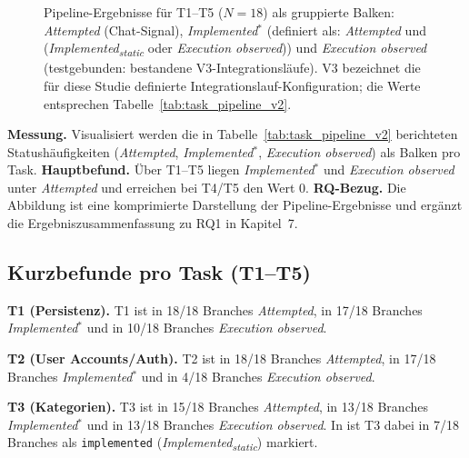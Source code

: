 \begin{figure}[ht]
{
}%
\caption{Pipeline-Ergebnisse für T1--T5 ($N=18$) als gruppierte Balken:  \textit{Attempted} (Chat-Signal),  \textit{Implemented$^\ast$} (definiert als:  \textit{Attempted} und (\textit{Implemented\textsubscript{static}} oder \textit{Execution observed})) und  \textit{Execution observed} (testgebunden: bestandene V3-Integrationsläufe). V3 bezeichnet die für diese Studie definierte Integrationslauf-Konfiguration; die Werte entsprechen Tabelle~\ref{tab:task_pipeline_v2}.}
\label{fig:task_pipeline_funnel_t1_t5}
\end{figure}

\noindent \textbf{Messung.} Visualisiert werden die in Tabelle~\ref{tab:task_pipeline_v2} berichteten Statushäufigkeiten (\textit{Attempted}, \textit{Implemented$^\ast$}, \textit{Execution observed}) als Balken pro Task.
\noindent \textbf{Hauptbefund.} Über T1--T5 liegen \textit{Implemented$^\ast$} und \textit{Execution observed} unter \textit{Attempted} und erreichen bei T4/T5 den Wert 0.
\noindent \textbf{RQ-Bezug.} Die Abbildung ist eine komprimierte Darstellung der Pipeline-Ergebnisse und ergänzt die Ergebniszusammenfassung zu RQ1 in Kapitel~7.

\subsection{Kurzbefunde pro Task (T1--T5)}
\noindent \textbf{T1 (Persistenz).} T1 ist in 18/18 Branches  \textit{Attempted}, in 17/18 Branches  \textit{Implemented$^\ast$} und in 10/18 Branches  \textit{Execution observed}.

\noindent \textbf{T2 (User Accounts/Auth).} T2 ist in 18/18 Branches  \textit{Attempted}, in 17/18 Branches  \textit{Implemented$^\ast$} und in 4/18 Branches  \textit{Execution observed}.

\noindent \textbf{T3 (Kategorien).} T3 ist in 15/18 Branches  \textit{Attempted}, in 13/18 Branches  \textit{Implemented$^\ast$} und in 13/18 Branches  \textit{Execution observed}. In  ist T3 dabei in 7/18 Branches als \texttt{implemented} (\textit{Implemented\textsubscript{static}}) markiert.

